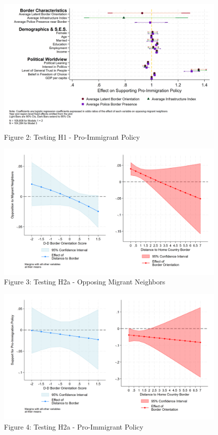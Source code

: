 \documentclass[12pt,]{article}
\begin{document}
\begin{figure}
\centering
\includegraphics{figures/border_orientation_policy_figure1.png}
\caption{Figure 2: Testing H1 - Pro-Immigrant Policy}
\end{figure}

\begin{figure}
\centering
\includegraphics{figures/m4_marginal_1.png}
\caption{Figure 3: Testing H2a - Opposing Migrant Neighbors}
\end{figure}

\begin{figure}
\centering
\includegraphics{figures/m4_policy_marginal_1.png}
\caption{Figure 4: Testing H2a - Pro-Immigrant Policy}
\end{figure}
\end{document}
